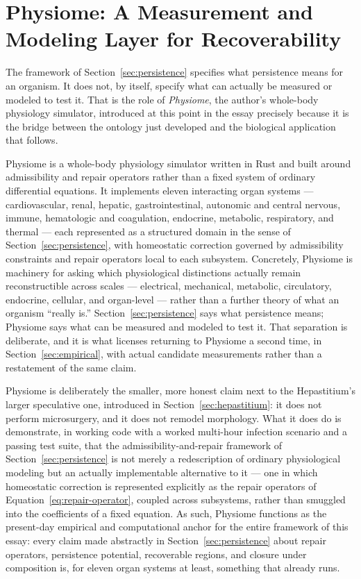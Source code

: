 \documentclass[12pt]{article}
\begin{document}
\section{Physiome: A Measurement and Modeling Layer for Recoverability}
\label{sec:physiome}

The framework of Section~\ref{sec:persistence} specifies what persistence means for an organism. It does not, by itself, specify what can actually be measured or modeled to test it. That is the role of \emph{Physiome}, the author's whole-body physiology simulator, introduced at this point in the essay precisely because it is the bridge between the ontology just developed and the biological application that follows.

Physiome is a whole-body physiology simulator written in Rust and built around admissibility and repair operators rather than a fixed system of ordinary differential equations. It implements eleven interacting organ systems --- cardiovascular, renal, hepatic, gastrointestinal, autonomic and central nervous, immune, hematologic and coagulation, endocrine, metabolic, respiratory, and thermal --- each represented as a structured domain in the sense of Section~\ref{sec:persistence}, with homeostatic correction governed by admissibility constraints and repair operators local to each subsystem. Concretely, Physiome is machinery for asking which physiological distinctions actually remain reconstructible across scales --- electrical, mechanical, metabolic, circulatory, endocrine, cellular, and organ-level --- rather than a further theory of what an organism ``really is.'' Section~\ref{sec:persistence} says what persistence means; Physiome says what can be measured and modeled to test it. That separation is deliberate, and it is what licenses returning to Physiome a second time, in Section~\ref{sec:empirical}, with actual candidate measurements rather than a restatement of the same claim.

Physiome is deliberately the smaller, more honest claim next to the Hepastitium's larger speculative one, introduced in Section~\ref{sec:hepastitium}: it does not perform microsurgery, and it does not remodel morphology. What it does do is demonstrate, in working code with a worked multi-hour infection scenario and a passing test suite, that the admissibility-and-repair framework of Section~\ref{sec:persistence} is not merely a redescription of ordinary physiological modeling but an actually implementable alternative to it --- one in which homeostatic correction is represented explicitly as the repair operators of Equation~\eqref{eq:repair-operator}, coupled across subsystems, rather than smuggled into the coefficients of a fixed equation. As such, Physiome functions as the present-day empirical and computational anchor for the entire framework of this essay: every claim made abstractly in Section~\ref{sec:persistence} about repair operators, persistence potential, recoverable regions, and closure under composition is, for eleven organ systems at least, something that already runs.
\end{document}
